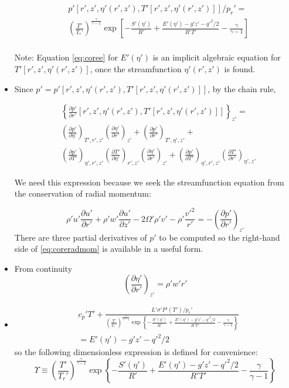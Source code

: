 \documentclass[preprint, prX]{revtex4}
\newcommand{\pfrac}[2]{\left(\frac{#1}{#2}\right)}
\newcommand{\pd}[2]{\frac{\partial#1}{\partial#2}}
\newcommand{\tpd}[3]{\left( \frac{\partial#1}{\partial#2} \right)_{#3}}
\newcommand{\gogmo}{\frac{\gamma}{\gamma-1}}
\begin{document}
\begin{itemize}
\begin{equation}
\begin{split}
&p'\left[r',z',\eta'(r',z'), T'[r',z',\eta'(r',z')] \right]/p_r' =  \\
&\left( \frac{T'}{T_r'}\right)^\gogmo \exp \left[ -\frac{S'(\eta')}{R'}+ \frac{E'(\eta') - g'z' - q'^2/2}{R' T'} - \gogmo	\right] \\
\end{split}
\label{eq:corep}
\end{equation}

Note: Equation \eqref{eq:coree} for $E'(\eta')$ is an implicit algebraic equation for $T'[r',z',\eta'(r',z')]$, once the streamfunction $\eta'(r',z')$ is found.

\item Since $p' = p'[r',z',\eta'(r',z'), T'[r',z',\eta'(r',z')]]$, by the chain rule,

\begin{equation}
\begin{split}
&\left \{ \pd{ p'}{ r'} \left[r',z',\eta'(r',z'), T'[r',z',\eta'(r',z')] \right] \right \}_{z'} =\\
& \tpd{ p'}{ \eta'}{T', r', z'}\tpd{ \eta'}{ r'}{z'}+\tpd{ p'}{ r'}{T', \eta', z'}+\\
& \tpd{ p'}{ T'}{\eta', r',z'}\tpd{ T'}{ \eta'}{r',z'}\tpd{ \eta'}{ r'}{z'}+\tpd{ p'}{ T'}{\eta', r',z'} \tpd{ T'}{ r'}{\eta',z'}
\end{split}
\label{eq:pchain}
\end{equation}

We need this expression because we seek the streamfunction equation from the conservation of radial momentum:

\begin{equation}
	\rho'u'\pd{ u'}{ r'} + \rho'w' \pd{ u'}{ z'} - 2 \Omega' \rho'v' - \rho' \frac{v'^2}{r'} = -\tpd{ p'}{ r'}{z'}
	\label{eq:coreradmom}
\end{equation}
There are three partial derivatives of $p'$ to be computed so the right-hand side of \eqref{eq:coreradmom} is available in a useful form.

\item From continuity
\begin{equation}
\tpd{ \eta'}{ r'}{z'} = \rho' w' r'
\end{equation}
\item
\begin{equation}
\begin{split}
	&c_p' T' + \frac{L' \sigma' P'(T')/p_r'}{\pfrac{T'}{T_r'}^\gogmo \exp \left\{ -\frac{S'(\eta')}{R'} + \frac{E'(\eta') - g'z' - q'^2/2}{R'T'} - \gogmo \right\}} \\
	& = E'(\eta') - g'z' - q'^2/2
	\end{split}
	\label{eq:coree2}
\end{equation}
so the following dimensionless expression is defined for convenience:
\begin{equation}
\Upsilon \equiv \pfrac{T'}{T_r'}^\gogmo \exp \left\{ -\frac{S'(\eta')}{R'} + \frac{E'(\eta') - g'z' - q'^2/2}{R'T'} - \gogmo \right\}
\end{equation}


\end{itemize}
\end{document}

